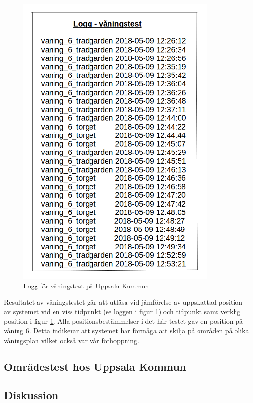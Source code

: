 \documentclass[swedish, a4paper,12pt]{article}
\begin{document}
\begin{figure}[H]
  \centering
  \includegraphics[width=10cm]{media/logg_vaningstest.png}
  \caption{Logg för våningstest på Uppsala Kommun}
  \label{fig:logg_vaningstest}
\end{figure}

Resultatet av våningstestet går att utläsa vid jämförelse av uppskattad position av systemet vid en viss tidpunkt (se loggen i figur \ref{fig:logg_vaningstest}) och tidpunkt samt verklig position i figur \ref{fig:logg_vaningstest}. Alla positionsbestämmelser i det här testet gav en position på våning 6. Detta indikerar att systemet har förmåga att skilja på områden på olika våningsplan vilket också var vår förhoppning.

\subsection{Områdestest hos Uppsala Kommun}

\subsection{Diskussion}
\end{document}
